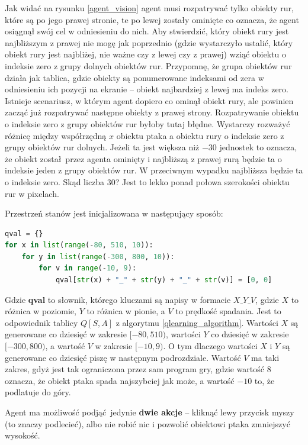 \documentclass[a4paper, 12pt,oneside]{book}
\begin{document}
Jak widać na rysunku \ref{agent_vision} agent musi rozpatrywać tylko obiekty
rur, które są po jego prawej stronie, te po lewej zostały ominięte co oznacza,
że agent osiągnął swój cel w odniesieniu do nich. Aby stwierdzić, który obiekt
rury jest najbliższym z prawej nie mogę jak poprzednio (gdzie wystarczyło
ustalić, który obiekt rury jest najbliżej, nie ważne czy z lewej czy z prawej)
wziąć obiektu o indeksie zero z grupy dolnych obiektów rur. Przypomnę, że grupa
obiektów rur działa jak tablica, gdzie obiekty są ponumerowane indeksami od
zera w odniesieniu ich pozycji na ekranie -- obiekt najbardziej z lewej ma
indeks zero. Istnieje scenariusz, w którym agent dopiero co ominął obiekt rury,
ale powinien zacząć już rozpatrywać następne obiekty z prawej strony.
Rozpatrywanie obiektu o indeksie zero z grupy obiektów rur byłoby tutaj błędne.
Wystarczy rozważyć różnicę między współrzędną $x$ obiektu ptaka a obiektu rury
o indeksie zero z grupy obiektów rur dolnych. Jeżeli ta jest większa niż $-30$
jednostek to oznacza, że obiekt został przez agenta ominięty i najbliższą z
prawej rurą będzie ta o indeksie jeden z grupy obiektów rur. W przeciwnym
wypadku najbliższa będzie ta o indeksie zero. Skąd liczba $30$? Jest to lekko
ponad połowa szerokości obiektu rur w pixelach.

Przestrzeń stanów jest inicjalizowana w następujący sposób:
\begin{lstlisting}[language=Python, label={qval_init}, caption={Inicjalizacja
Q-Values}, captionpos=t]
qval = {}
for x in list(range(-80, 510, 10)):
    for y in list(range(-300, 800, 10)):
        for v in range(-10, 9):
            qval[str(x) + "_" + str(y) + "_" + str(v)] = [0, 0]
\end{lstlisting}
Gdzie \textbf{qval} to słownik, którego kluczami są napisy w formacie
$X\_Y\_V$, gdzie $X$ to różnica w poziomie, $Y$ to różnica w pionie, a $V$ to
prędkość spadania. Jest to odpowiednik tablicy $Q[S,A]$ z algorytmu
\ref{qlearning_algorithm}. Wartości $X$ są generowane co dziesięć w zakresie
$[-80,510)$, wartości $Y$ co dziesięć w zakresie $[-300,800)$, a wartość $V$ w
zakresie $[-10,9)$. O tym dlaczego wartości $X$ i $Y$ są generowane co dziesięć
piszę w następnym podrozdziale. Wartość $V$ ma taki zakres, gdyż jest tak
ograniczona przez sam program gry, gdzie wartość $8$ oznacza, że obiekt ptaka
spada najszybciej jak może, a wartość $-10$ to, że podlatuje do góry.

Agent ma możliwość podjąć jedynie \textbf{dwie akcje} -- kliknąć lewy przycisk
myszy (to znaczy podlecieć), albo nie robić nic i pozwolić obiektowi ptaka
zmniejszyć wysokość.
\end{document}
